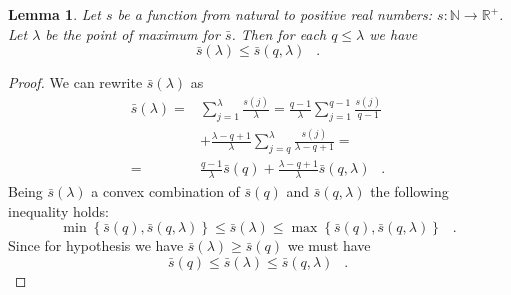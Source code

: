 \documentclass[11pt,a4paper]{article}
\DeclareMathOperator{\mf}{\enspace .}
\newtheorem{lemma}{Lemma}
\theoremstyle{definition}
\theoremstyle{remark}
\begin{document}
\begin{lemma}
  \label{sub-lemma}
  Let \(s\) be a function from natural to positive real numbers: \(s: \mathbb{N}
  \rightarrow \mathbb{R}^+ \).  Let \(\lambda\) be the point of maximum for
  \(\bar s\).  Then for each \(q \leq \lambda\) we have
  \begin{equation}
    \bar s(\lambda) \leq \bar s(q,\lambda) \mf
  \end{equation}
\end{lemma}
\begin{proof}
  We can rewrite \(\bar s(\lambda)\) as
  \begin{align}
    \bar s(\lambda)=&\sum_{j=1}^{\lambda} \frac{s(j)}{\lambda}=\frac{q-1}{\lambda}\sum_{j=1}^{q-1}
    \frac{s(j)}{q-1} \\&+ \frac{\lambda-q+1}{\lambda} \sum_{j=q}^{\lambda}
    \frac{s(j)}{\lambda-q+1}=\\
    =&\frac{q-1}{\lambda} \bar s(q) + \frac{\lambda-q+1}{\lambda} \bar
    s(q,\lambda)  \mf
  \end{align}
  Being \(\bar s(\lambda)\) a convex combination of \(\bar s(q)\) and \(\bar
  s(q,\lambda)\) the following inequality holds:
  \begin{equation}
  \min \left\{\bar s(q),\bar s(q,\lambda) \right\} \leq \bar s(\lambda) \leq \max
  \left\{\bar s(q),\bar s(q,\lambda) \right\} \mf
  \end{equation}
  Since for hypothesis we have \(\bar s(\lambda) \geq \bar s(q)\) we must have
  \begin{equation}
  \bar s(q) \leq \bar s(\lambda) \leq \bar s(q,\lambda)  \mf
  \end{equation}
\end{proof}
\end{document}
